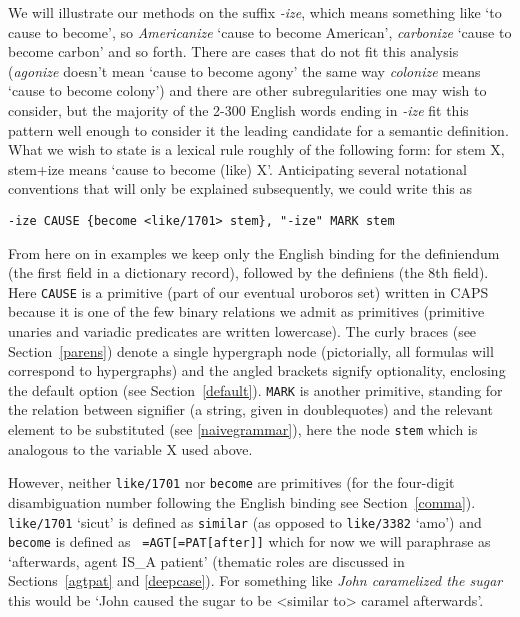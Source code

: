 \documentclass[11pt,bookmarks,bookmarksnumbered,naturalnames,plainpages=false,pdftex,colorlinks=true,urlcolor=blue,bookmarksdepth=subsection,plainpages=false]{paper}
\begin{document}
We will illustrate our methods on the suffix {\it -ize}, which means something
like `to cause to become', so {\it Americanize} `cause to become American',
{\it carbonize} `cause to become carbon' and so forth. There are cases that do
not fit this analysis ({\it agonize} doesn't mean `cause to become agony' the
same way {\it colonize} means `cause to become colony') and there are other
subregularities one may wish to consider, but the majority of the 2-300
English words ending in {\it -ize} fit this pattern well enough to consider it
the leading candidate for a semantic definition. What we wish to state is a
lexical rule roughly of the following form: for stem X, stem+ize means `cause
to become (like) X'. Anticipating several notational conventions that will
only be explained subsequently, we could write this as 

\begin{verbatim}
-ize CAUSE {become <like/1701> stem}, "-ize" MARK stem
\end{verbatim}

\noindent 
From here on in examples we keep only the English binding for the definiendum
(the first field in a dictionary record), followed by the definiens (the 8th
field).  Here {\tt CAUSE} is a primitive (part of our eventual uroboros set)
written in CAPS because it is one of the few binary relations we admit as
primitives (primitive unaries and variadic predicates are written lowercase).
The curly braces (see Section~\ref{parens}) denote a single hypergraph node
(pictorially, all formulas will correspond to hypergraphs) and the angled
brackets signify optionality, enclosing the default option (see
Section~\ref{default}). {\tt MARK} is another primitive, standing for the
relation between signifier (a string, given in doublequotes) and the relevant
element to be substituted (see \ref{naivegrammar}), here the node {\tt stem}
which is analogous to the variable X used above.

However, neither {\tt like/1701} nor {\tt become} are primitives (for the
four-digit disambiguation number following the English binding see
Section~\ref{comma}). {\tt like/1701} `sicut' is defined as {\tt similar} (as
opposed to {\tt like/3382} `amo') and {\tt become} is defined as {\tt
  =AGT[=PAT[after]]} which for now we will paraphrase as `afterwards, agent
IS\_A patient' (thematic roles are discussed in Sections~\ref{agtpat} and
\ref{deepcase}). For something like {\it John caramelized the sugar} this 
would be `John caused the sugar to be <similar to> caramel afterwards'. 
\end{document}
